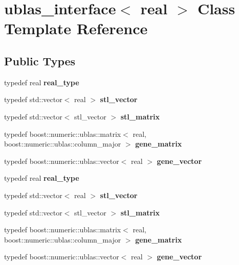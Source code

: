 \hypertarget{classublas__interface}{}\section{ublas\+\_\+interface$<$ real $>$ Class Template Reference}
\label{classublas__interface}
\subsection*{Public Types}
\begin{DoxyCompactItemize}
\item 
\mbox{\label{classublas__interface_a24b220d867ddf8582c3b70786fb31ca7}} 
typedef real {\bfseries real\+\_\+type}
\item 
\mbox{\label{classublas__interface_ab781eafe583c10540b425c7c1251f366}} 
typedef std\+::vector$<$ real $>$ {\bfseries stl\+\_\+vector}
\item 
\mbox{\label{classublas__interface_ac38f512a6667170c77d1ec3ad30f5267}} 
typedef std\+::vector$<$ stl\+\_\+vector $>$ {\bfseries stl\+\_\+matrix}
\item 
\mbox{\label{classublas__interface_a0346fc1535af625113592c350892e703}} 
typedef boost\+::numeric\+::ublas\+::matrix$<$ real, boost\+::numeric\+::ublas\+::column\+\_\+major $>$ {\bfseries gene\+\_\+matrix}
\item 
\mbox{\label{classublas__interface_a84641db47b08b3e988cea0bc196185cc}} 
typedef boost\+::numeric\+::ublas\+::vector$<$ real $>$ {\bfseries gene\+\_\+vector}
\item 
\mbox{\label{classublas__interface_a24b220d867ddf8582c3b70786fb31ca7}} 
typedef real {\bfseries real\+\_\+type}
\item 
\mbox{\label{classublas__interface_ab781eafe583c10540b425c7c1251f366}} 
typedef std\+::vector$<$ real $>$ {\bfseries stl\+\_\+vector}
\item 
\mbox{\label{classublas__interface_ac38f512a6667170c77d1ec3ad30f5267}} 
typedef std\+::vector$<$ stl\+\_\+vector $>$ {\bfseries stl\+\_\+matrix}
\item 
\mbox{\label{classublas__interface_a0346fc1535af625113592c350892e703}} 
typedef boost\+::numeric\+::ublas\+::matrix$<$ real, boost\+::numeric\+::ublas\+::column\+\_\+major $>$ {\bfseries gene\+\_\+matrix}
\item 
\mbox{\label{classublas__interface_a84641db47b08b3e988cea0bc196185cc}} 
typedef boost\+::numeric\+::ublas\+::vector$<$ real $>$ {\bfseries gene\+\_\+vector}
\end{DoxyCompactItemize}
